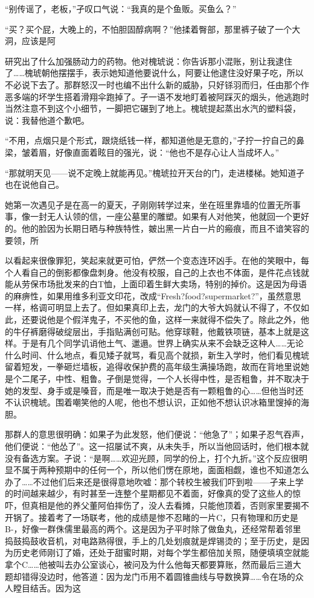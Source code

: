 \documentclass{article}
\begin{document}
“别传谣了，老板，”孑叹口气说：“我真的是个鱼贩。买鱼么？”

“买？买个屁，大晚上的，不怕胆固醇病啊？”他揉着臀部，那里裤子破了一个大洞，应该是阿

\newpage 

研究出了什么加强肠动力的药物。他对槐琥说：你告诉那小混账，别让我逮住了……槐琥朝他摆摆手，表示她知道他要说什么，阿要让他逮住没好果子吃，所以不必说下去了。那群怒汉一时也编不出什么新的威胁，只好铩羽而归，任由那个作恶多端的坏学生搭着滑翔伞跑掉了。孑一语不发地盯着被阿踩灭的烟头，他逃跑时当然注意不到这个小细节，一脚把它碾到了地上。槐琥提起蒸出水汽的塑料袋，说：我替他道个歉吧。

“不用，点烟只是个形式，跟烧纸钱一样，都知道他是无意的，”孑拧一拧自己的鼻梁，皱着眉，好像直面着眩目的强光，说：“他也不是存心让人当成坏人。”

“那就明天见——说不定晚上就能再见。”槐琥拉开天台的门，走进楼梯。她知道孑也在说他自己。

她第一次遇见孑是在高一的夏天，孑刚刚转学过来，坐在班里靠墙的位置无所事事，像一封无人认领的信，一座公墓里的雕塑。如果有人对他笑，他就回一个更好的。他的脸因为长期日晒与种族特性，皴出黑一片白一片的瘢痕，而且不谙笑容的要领，所

\newpage 

以看起来很像罪犯，笑起来就更可怕，俨然一个变态连环凶手。在他的笑眼中，每个人看自己的倒影都像盘刺身。他没有校服，自己的上衣也不体面，是件花点钱就能从劳保市场批发来的白T恤，上面印着生鲜大卖场，特别的掉价。这是因为母语的麻痹性，如果用维多利亚文印花，改成“Fresh?food?supermarket?”，虽然意思一样，格调可明显上去了。但如果真印上去，龙门的大爷大妈就认不得了，不仅如此，还要说他是个假洋鬼子，不买他的鱼，这样一来就得不偿失了。除此之外，他的牛仔裤磨得破绽层出，手指贴满创可贴。他穿球鞋，他戴铁项链，基本上就是这样。于是有几个同学讥诮他土气、邋遢。世界上确实从来不会缺乏这种人……无论什么时间、什么地点，看见矮子就骂，看见高个就损，新生入学时，他们看见槐琥留着短发，一拳砸烂墙板，追得收保护费的高年级生满操场跑，故而在背地里说她是个二尾子，中性、粗鲁。孑倒是觉得，一个人长得中性，是否粗鲁，并不取决于她的发型、身手或是嗓音，而是唯一取决于她是否有一颗粗鲁的心……但他当时还不认识槐琥。围着嘲笑他的人呢，他也不想认识，正如他不想认识冰箱里馊掉的海胆。

\newpage 



那群人的意思很明确：如果孑为此发怒，他们便说：“他急了”；如果孑忍气吞声，他们便说：“他怂了”。这一招屡试不爽，从未失手，所以当他回话时，他们根本就没有备选方案。孑说：“是啊……欢迎光顾，同学的份上，打个九折。”这个反应很明显不属于两种预期中的任何一个，所以他们愣在原地，面面相觑，谁也不知道怎么办了……不过他们后来还是很得意地吹嘘：那个转校生被我们吓到啦——孑来上学的时间越来越少，有时甚至一连整个星期都见不着面，好像真的受了这些人的惊吓，但真相是他的养父董阿伯摔伤了，没人去看摊，只能他顶着，否则家里要揭不开锅了。接着考了一场联考，他的成绩是惨不忍睹的一片C，只有物理和历史是B-，好像一群侏儒里最高的两个。这是因为孑平时除了做鱼丸，还经常帮着邻里捣鼓捣鼓收音机，对电路熟得很，手上的几处划痕就是焊锡烫的；至于历史，是因为历史老师刚订了婚，还处于甜蜜时期，对每个学生都倍加关照，随便填填空就能拿个C……他被叫去办公室谈心，被问及为什么他每天都要算账，然而最后三道大题却错得没边时，他答道：因为龙门币用不着圆锥曲线与导数换算……令在场的众人瞠目结舌。因为这
\end{document}
